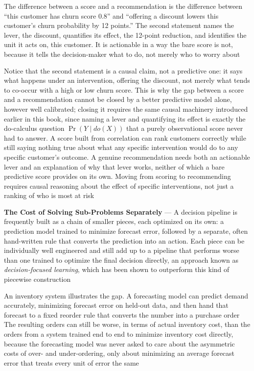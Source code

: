 The difference between a score and a recommendation is the difference between ``this
customer has churn score 0.8'' and ``offering a discount lowers this customer's
churn probability by 12 points.'' The second statement names the lever, the
discount, quantifies its effect, the 12-point reduction, and identifies the unit
it acts on, this customer. It is actionable in a way the bare score is not,
because it tells the decision-maker what to do, not merely who to worry about

Notice that the second statement is a causal claim, not a predictive one: it
says what happens under an intervention, offering the discount, not merely what
tends to co-occur with a high or low churn score. This is why the gap between a score
and a recommendation cannot be closed by a better predictive model alone,
however well calibrated; closing it requires the same causal machinery introduced
earlier in this book, since naming a lever and quantifying its effect is exactly
the do-calculus question $\Pr(Y \mid do(X))$ that a purely observational score
never had to answer. A score built from correlation can rank customers correctly
while still saying nothing true about what any specific intervention would do to
any specific customer's outcome. A genuine recommendation needs both an
actionable lever and an explanation of why that lever works, neither of which a bare
predictive score provides on its own. Moving from scoring to recommending
requires causal reasoning about the effect of specific interventions, not just a
ranking of who is most at risk

\textbf{The Cost of Solving Sub-Problems Separately} --- A decision pipeline is frequently
built as a chain of smaller pieces, each optimized on its own: a prediction model
trained to minimize forecast error, followed by a separate, often hand-written rule
that converts the prediction into an action. Each piece can be individually well
engineered and still add up to a pipeline that performs worse than one trained
to optimize the final decision directly, an approach known as \emph{decision-focused
learning}, which has been shown to outperform this kind of piecewise construction

An inventory system illustrates the gap. A forecasting model can predict demand accurately,
minimizing forecast error on held-out data, and then hand that forecast to a fixed
reorder rule that converts the number into a purchase order The resulting orders
can still be worse, in terms of actual inventory cost, than the orders from a system
trained end to end to minimize inventory cost directly, because the forecasting
model was never asked to care about the asymmetric costs of over- and under-ordering,
only about minimizing an average forecast error that treats every unit of error
the same

